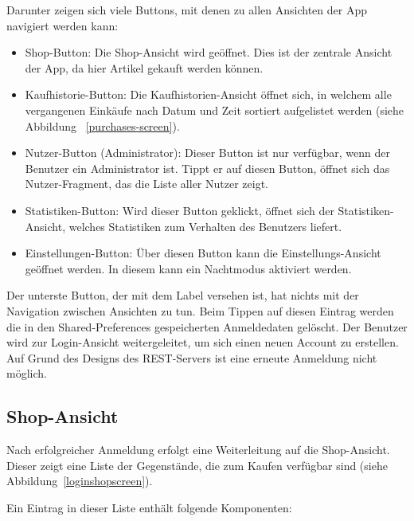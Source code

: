 Darunter zeigen sich viele Buttons, mit denen zu allen Ansichten der App navigiert werden kann:

\begin{itemize}
	\item Shop-Button: Die Shop-Ansicht wird geöffnet.
	Dies ist der zentrale Ansicht der App, da hier Artikel gekauft werden können.

	\item Kaufhistorie-Button: Die Kaufhistorien-Ansicht öffnet sich, in welchem alle vergangenen Einkäufe nach Datum und Zeit sortiert aufgelistet werden (siehe Abbildung ~\ref{purchases-screen}).

	\item Nutzer-Button (Administrator): Dieser Button ist nur verfügbar, wenn der Benutzer ein Administrator ist.
	Tippt er auf diesen Button, öffnet sich das Nutzer-Fragment, das die Liste aller Nutzer zeigt.

	\item Statistiken-Button: Wird dieser Button geklickt, öffnet sich der Statistiken-Ansicht, welches Statistiken zum Verhalten des Benutzers liefert.

	\item Einstellungen-Button: Über diesen Button kann die Einstellungs-Ansicht geöffnet werden.
	In diesem kann ein Nachtmodus aktiviert werden.

\end{itemize}

Der unterste Button, der mit dem Label  versehen ist, hat nichts mit der Navigation zwischen Ansichten zu tun.
Beim Tippen auf diesen Eintrag werden die in den Shared-Preferences gespeicherten Anmeldedaten gelöscht.
Der Benutzer wird zur Login-Ansicht weitergeleitet, um sich einen neuen Account zu erstellen.
Auf Grund des Designs des REST-Servers ist eine erneute Anmeldung nicht möglich.

\subsection{Shop-Ansicht}\label{subsec:shop-screen}

Nach erfolgreicher Anmeldung erfolgt eine Weiterleitung auf die Shop-Ansicht.
Dieser zeigt eine Liste der Gegenstände, die zum Kaufen verfügbar sind (siehe Abbildung~\ref{loginshopscreen}).

Ein Eintrag in dieser Liste enthält folgende Komponenten:

